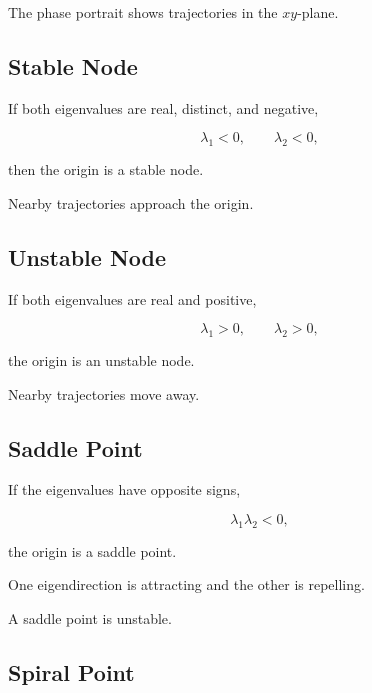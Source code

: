 The phase portrait shows trajectories in the \(xy\)-plane.

\subsection{Stable Node}
\label{subsec:stable-node}

If both eigenvalues are real, distinct, and negative,

\[
\boxed{
\lambda_1<0,
\qquad
\lambda_2<0,
}
\]

then the origin is a stable node.

Nearby trajectories approach the origin.

\subsection{Unstable Node}
\label{subsec:unstable-node}

If both eigenvalues are real and positive,

\[
\boxed{
\lambda_1>0,
\qquad
\lambda_2>0,
}
\]

the origin is an unstable node.

Nearby trajectories move away.

\subsection{Saddle Point}
\label{subsec:saddle-point-linear-system}

If the eigenvalues have opposite signs,

\[
\boxed{
\lambda_1\lambda_2<0,
}
\]

the origin is a saddle point.

One eigendirection is attracting and the other is repelling.

A saddle point is unstable.

\subsection{Spiral Point}
\label{subsec:spiral-point-linear-system}

